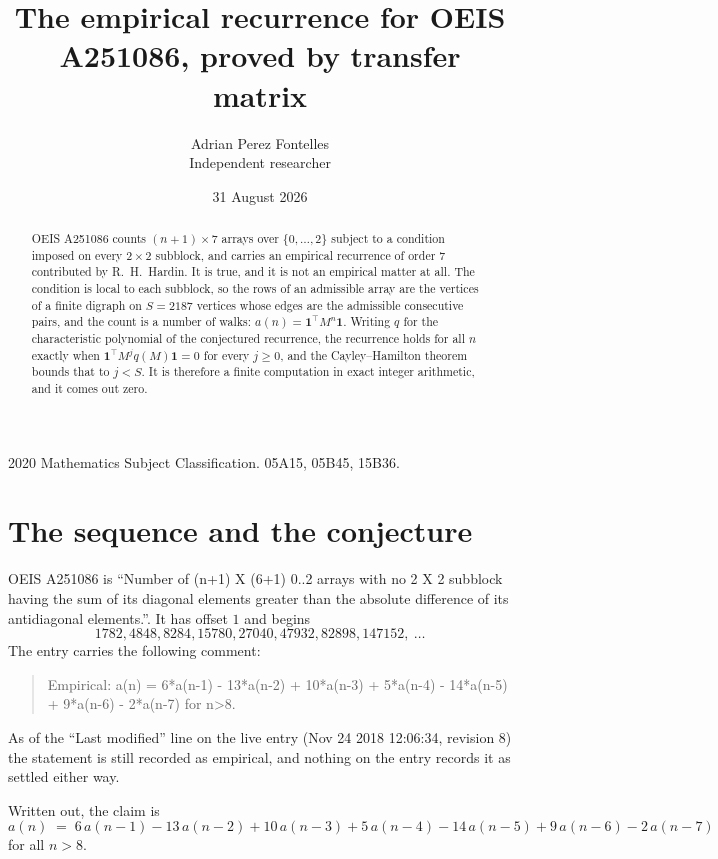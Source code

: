 \documentclass[11pt,a4paper]{article}
\title{The empirical recurrence for OEIS A251086, proved by transfer matrix}
\author{Adrian Perez Fontelles\\ \small Independent researcher}
\date{31 August 2026}
\theoremstyle{plain}
\theoremstyle{definition}
\begin{document}
\maketitle

\begin{abstract}
OEIS A251086 counts $(n+1)\times7$ arrays over $\{0,\dots,2\}$ subject to a condition imposed on
every $2\times2$ subblock, and carries an empirical recurrence of order $7$ contributed
by R.~H.~Hardin. It is true, and it is not an empirical matter at all. The condition is local
to each subblock, so the rows of an admissible array are the vertices of a finite digraph
on $S=2187$ vertices whose edges are the admissible consecutive pairs, and the count is a
number of walks: $a(n)=\mathbf{1}^{\!\top}M^{n}\mathbf{1}$. Writing $q$
for the characteristic polynomial of the conjectured recurrence, the recurrence holds for all
$n$ exactly when $\mathbf{1}^{\!\top}M^{j}q(M)\mathbf{1}=0$ for every $j\ge0$, and the
Cayley--Hamilton theorem bounds that to $j<S$. It is therefore a finite computation in exact
integer arithmetic, and it comes out zero.
\end{abstract}

\noindent\small 2020 Mathematics Subject Classification. 05A15, 05B45, 15B36.\normalsize

\section{The sequence and the conjecture}

OEIS A251086 is ``Number of (n+1) X (6+1) 0..2 arrays with no 2 X 2 subblock having the sum of its diagonal elements greater than the absolute difference of its antidiagonal elements.''. It has offset $1$ and begins
\[
1782, 4848, 8284, 15780, 27040, 47932, 82898, 147152,\ \dots
\]
The entry carries the following comment:
\begin{quote}\small
Empirical: a(n) = 6*a(n-1) - 13*a(n-2) + 10*a(n-3) + 5*a(n-4) - 14*a(n-5) + 9*a(n-6) - 2*a(n-7) for n>8.
\end{quote}
As of the ``Last modified'' line on the live entry (Nov 24 2018 12:06:34, revision 8) the statement is
still recorded as empirical, and nothing on the entry records it as settled either way.

Written out, the claim is
\begin{equation}\label{eq:conj}
a(n)\;=\;6\,a(n-1) - 13\,a(n-2) + 10\,a(n-3) + 5\,a(n-4) - 14\,a(n-5) + 9\,a(n-6) - 2\,a(n-7)
\end{equation}
for all $n>8$.
\end{document}
